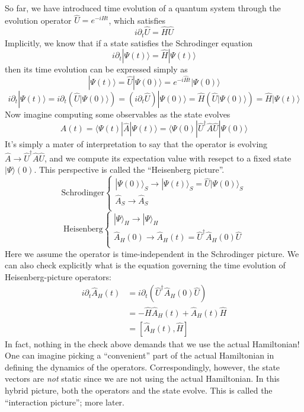 So far, we have introduced time evolution of a quantum system through the evolution operator $\hat{U}=e^{-i\hat{H}t}$, which satisfies
\[ i\partial _t\hat{U}=\hat{H}\hat{U}\]
Implicitly, we know that if a state satisfies the Schrodinger equation
\[ i\partial _t|\Psi \left( t \right) \rangle =\hat{H}|\Psi \left( t \right) \rangle \]
then its time evolution can be expressed simply as
\[ |\Psi \left( t \right) \rangle =\hat{U}|\Psi \left( 0 \right) \rangle =e^{-i\hat{H}t}|\Psi \left( 0 \right) \rangle \]
\[ i\partial _t|\Psi \left( t \right) \rangle =i\partial _t\left( \hat{U}|\Psi \left( 0 \right) \rangle \right) =\left( i\partial _t\hat{U} \right) |\Psi \left( 0 \right) \rangle =\hat{H}\left( \hat{U}|\Psi \left( 0 \right) \rangle \right) =\hat{H}|\Psi \left( t \right) \rangle \]
Now imagine computing some observables as the state evolves
\[ A\left( t \right) =\langle \Psi \left( t \right) |\hat{A}|\Psi \left( t \right) \rangle =\langle \Psi \left( 0 \right) |\hat{U}^{\dagger}\hat{A}\hat{U}|\Psi \left( 0 \right) \rangle \]
It's simply a mater of interpretation to say that the operator is evolving $\hat{A}\rightarrow \hat{U}^{\dagger}\hat{A}\hat{U}$, and we compute its expectation value with resepct to a fixed state $|\Psi\rangle(0)$. This perspective is called the ``Heisenberg picture''.
\[ \mathrm{Schrodinger}\begin{cases}
	|\Psi \left( 0 \right) \rangle _S\rightarrow |\Psi \left( t \right) \rangle _S=\hat{U}|\Psi \left( 0 \right) \rangle _S\\
	\hat{A}_S\rightarrow \hat{A}_S\\
\end{cases}\]
\[ \mathrm{Heisenberg}\begin{cases}
	|\Psi \rangle _H\rightarrow |\Psi \rangle _H\\
	\hat{A}_H\left( 0 \right) \rightarrow \hat{A}_H\left( t \right) =\hat{U}^{\dagger}\hat{A}_H\left( 0 \right) \hat{U}\\
\end{cases}\]
Here we assume the operator is time-independent in the Schrodinger picture. We can also check explicitly what is the equation governing the time evolution of Heisenberg-picture operators:
\begin{align*}
    i\partial _t\hat{A}_H\left( t \right) &=i\partial _t\left( \hat{U}^{\dagger}\hat{A}_H\left( 0 \right) \hat{U} \right) \\
    &=-\hat{H}\hat{A}_H\left( t \right) +\hat{A}_H\left( t \right) \hat{H}\\
    &=\left[ \hat{A}_H\left( t \right) ,\hat{H} \right]
\end{align*}
In fact, nothing in the check above demands that we use the actual Hamiltonian! One can imagine picking a ``convenient'' part of the actual Hamiltonian in defining the dynamics of the operators. Correspondingly, however, the state vectors are \emph{not} static since we are not using the actual Hamiltonian. In this hybrid picture, both the operators and the state evolve. This is called the ``interaction picture''; more later.


